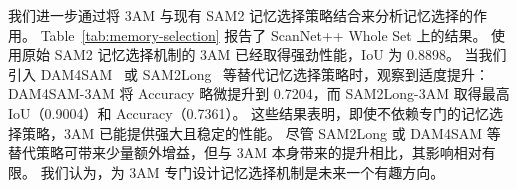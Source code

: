 \begin{table}[t]
\centering
\small
\setlength{\tabcolsep}{2mm}
\vspace{-3mm}

\begin{minipage}{0.48\textwidth}
\caption{ScanNet++ Whole Set 上不同记忆选择方法的比较。}
\label{tab:memory-selection}
\vspace{-3mm}
\end{minipage}
\begin{minipage}{0.48\textwidth}
\caption{不同 3D 重建骨干网络的比较。}
\label{tab:3D_backbone}
\end{minipage}
\vspace{-3mm}
\end{table}

我们进一步通过将 3AM 与现有 SAM2 记忆选择策略结合来分析记忆选择的作用。
Table~\ref{tab:memory-selection} 报告了 ScanNet++ Whole Set 上的结果。
使用原始 SAM2 记忆选择机制的 3AM 已经取得强劲性能，IoU 为 0.8898。
当我们引入 DAM4SAM~\cite{videnovic2025distractor} 或 SAM2Long~\cite{ding2024sam2long} 等替代记忆选择策略时，观察到适度提升：DAM4SAM-3AM 将 Accuracy 略微提升到 0.7204，而 SAM2Long-3AM 取得最高 IoU（0.9004）和 Accuracy（0.7361）。
这些结果表明，即使不依赖专门的记忆选择策略，3AM 已能提供强大且稳定的性能。
尽管 SAM2Long 或 DAM4SAM 等替代策略可带来少量额外增益，但与 3AM 本身带来的提升相比，其影响相对有限。
我们认为，为 3AM 专门设计记忆选择机制是未来一个有趣方向。

